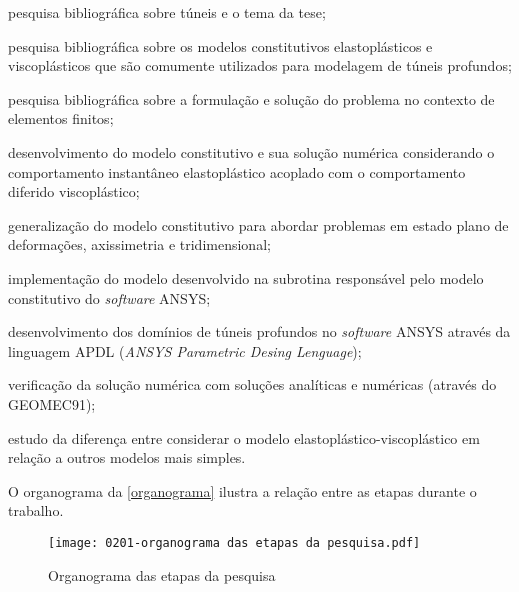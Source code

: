 \begin{alineas}

	\item pesquisa bibliográfica sobre túneis e o tema da tese;
	
	\item pesquisa bibliográfica sobre os modelos constitutivos elastoplásticos e viscoplásticos que são comumente utilizados para modelagem de túneis profundos;
	
	\item pesquisa bibliográfica sobre a formulação e solução do problema no contexto de elementos finitos;
	
	\item desenvolvimento do modelo constitutivo e sua solução numérica considerando o comportamento instantâneo elastoplástico acoplado com o comportamento diferido viscoplástico;
	
	\item generalização do modelo constitutivo para abordar problemas em estado plano de deformações, axissimetria e tridimensional;	
	
	\item implementação do modelo desenvolvido na subrotina responsável pelo modelo constitutivo do \textit{software} ANSYS;	
	
	\item desenvolvimento dos domínios de túneis profundos no \textit{software} ANSYS através da linguagem APDL (\textit{ANSYS Parametric Desing Lenguage});
	
	\item verificação da solução numérica com soluções analíticas e numéricas (através do GEOMEC91);
	
	\item estudo da diferença entre considerar o modelo elastoplástico-viscoplástico em relação a outros modelos mais simples.

\end{alineas}

O organograma da \autoref{organograma} ilustra a relação entre as etapas durante o trabalho.

\begin{figure}[H]
	\begin{center}
		\texttt{[image: 0201-organograma das etapas da pesquisa.pdf]}
	\end{center}
	\caption{\label{organograma}Organograma das etapas da pesquisa}
\end{figure}